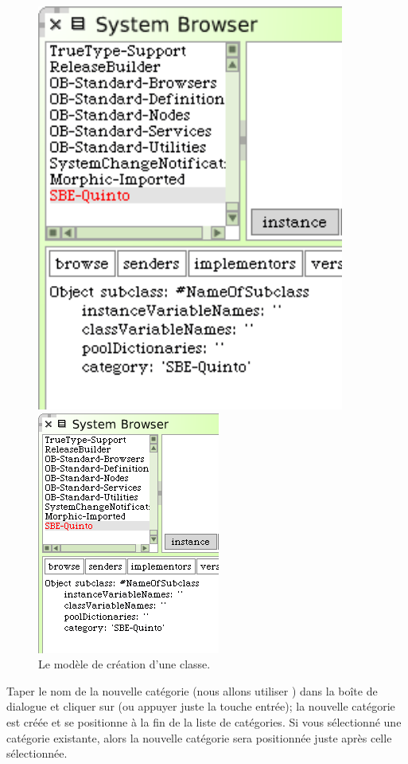 \documentclass[a4paper,10pt,twoside]{book}
\begin{document}
\begin{figure}[htb]
\begin{minipage}[b]{0.48\textwidth}
	{\centerline {\includegraphics[width=0.9\textwidth]{ClassTemplate}}}
	{\centerline {\includegraphics[scale=0.7]{ClassTemplate}}}
	\caption{Le modèle de création d'une classe.
	\label{fig:classTemplate}}
\end{minipage}
\end{figure}

Taper le nom de la nouvelle catégorie (nous allons utiliser ) dans la boîte de dialogue et cliquer sur  (ou appuyer juste la touche entrée); la nouvelle catégorie est créée et se positionne à la fin de la liste de catégories.
Si vous sélectionné une catégorie existante, alors la nouvelle catégorie sera positionnée juste après celle sélectionnée.
\end{document}

